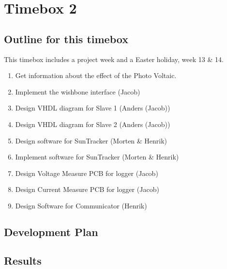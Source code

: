\documentclass[12pt,a4paper]{report}
\begin{document}
\section{Timebox 2}
\subsection{Outline for this timebox}
This timebox includes a project week and a Easter holiday, week 13 \& 14.
\begin{enumerate}
\item Get information about the effect of the Photo Voltaic.
\item Implement the wishbone interface (Jacob)
\item Design VHDL diagram for Slave 1 (Anders (Jacob))
\item Design VHDL diagram for Slave 2 (Anders (Jacob))
\item Design software for SunTracker (Morten \& Henrik)
\item Implement software for SunTracker (Morten \& Henrik)
\item Design Voltage Measure PCB for logger (Jacob)
\item Design Current Measure PCB for logger (Jacob)
\item Design Software for Communicator (Henrik)
\end{enumerate}

\subsection{Development Plan}


\subsection{Results}





\end{document}
